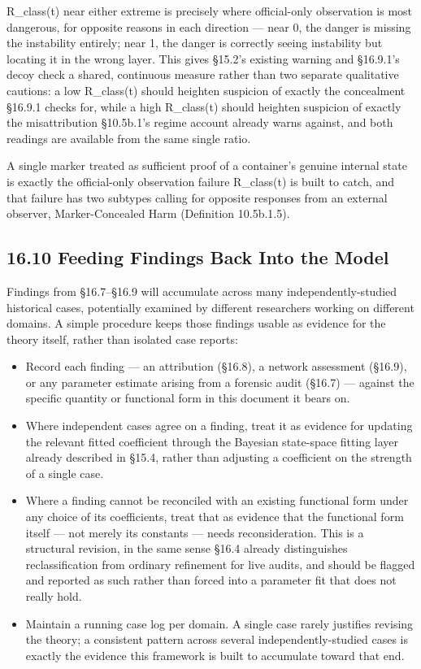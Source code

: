 \documentclass[
]{article}
\begin{document}
R\_class(t) near either extreme is precisely where official-only
observation is most dangerous, for opposite reasons in each direction
--- near 0, the danger is missing the instability entirely; near 1, the
danger is correctly seeing instability but locating it in the wrong
layer. This gives §15.2's existing warning and §16.9.1's decoy check a
shared, continuous measure rather than two separate qualitative
cautions: a low R\_class(t) should heighten suspicion of exactly the
concealment §16.9.1 checks for, while a high R\_class(t) should heighten
suspicion of exactly the misattribution §10.5b.1's regime account
already warns against, and both readings are available from the same
single ratio.

A single marker treated as sufficient proof of a container's genuine
internal state is exactly the official-only observation failure
R\_class(t) is built to catch, and that failure has two subtypes calling
for opposite responses from an external observer, Marker-Concealed Harm
(Definition 10.5b.1.5).

\hypertarget{feeding-findings-back-into-the-model}{%
\subsection{16.10 Feeding Findings Back Into the
Model}\label{feeding-findings-back-into-the-model}}

Findings from §16.7--§16.9 will accumulate across many
independently-studied historical cases, potentially examined by
different researchers working on different domains. A simple procedure
keeps those findings usable as evidence for the theory itself, rather
than isolated case reports:

\begin{itemize}
\item
  Record each finding --- an attribution (§16.8), a network assessment
  (§16.9), or any parameter estimate arising from a forensic audit
  (§16.7) --- against the specific quantity or functional form in this
  document it bears on.
\item
  Where independent cases agree on a finding, treat it as evidence for
  updating the relevant fitted coefficient through the Bayesian
  state-space fitting layer already described in §15.4, rather than
  adjusting a coefficient on the strength of a single case.
\item
  Where a finding cannot be reconciled with an existing functional form
  under any choice of its coefficients, treat that as evidence that the
  functional form itself --- not merely its constants --- needs
  reconsideration. This is a structural revision, in the same sense
  §16.4 already distinguishes reclassification from ordinary refinement
  for live audits, and should be flagged and reported as such rather
  than forced into a parameter fit that does not really hold.
\item
  Maintain a running case log per domain. A single case rarely justifies
  revising the theory; a consistent pattern across several
  independently-studied cases is exactly the evidence this framework is
  built to accumulate toward that end.
\end{itemize}
\end{document}
